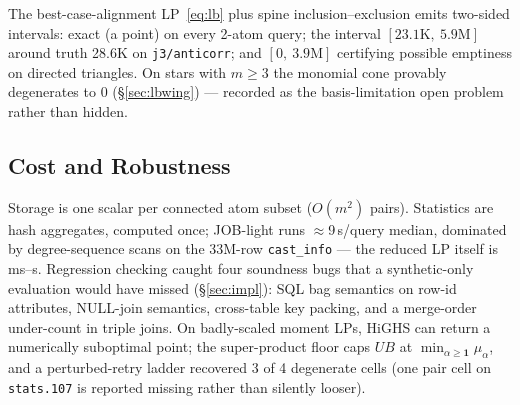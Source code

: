 The best-case-alignment LP~\eqref{eq:lb} plus spine
inclusion--exclusion emits two-sided intervals: exact (a point) on
every 2-atom query; the interval $[23.1\text{K},\ 5.9\text{M}]$
around truth 28.6K
on \texttt{j3/anticorr}; and $[0,\ 3.9\text{M}]$ certifying possible
emptiness on directed triangles.  On stars with $m\ge3$ the monomial
cone provably degenerates to 0 (\S\ref{sec:lbwing}) --- recorded as
the basis-limitation open problem rather than hidden.

\subsection{Cost and Robustness}
\label{sec:exp:cost}

Storage is one scalar per connected atom subset ($O(m^2)$ pairs).
Statistics are hash aggregates, computed once; JOB-light runs
$\approx$9\,s/query median, dominated by degree-sequence scans on the
33M-row \texttt{cast\_info} --- the reduced LP itself is ms--s.
Regression checking caught four soundness bugs that a synthetic-only
evaluation would have missed (\S\ref{sec:impl}): SQL bag semantics
on row-id attributes, NULL-join semantics, cross-table key packing,
and a merge-order under-count in triple joins.  On badly-scaled
moment LPs, HiGHS can return a numerically suboptimal point; the
super-product floor caps $UB$ at $\min_{\alpha\ge\mathbf{1}}\mu_\alpha$,
and a perturbed-retry ladder recovered 3 of 4 degenerate cells (one
pair cell on \texttt{stats.107} is reported missing rather than
silently looser).
